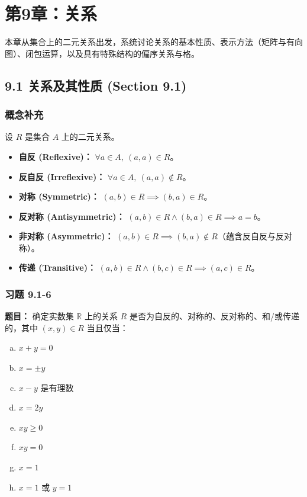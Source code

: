 \documentclass[11pt,UTF8]{article}
\begin{document}
\newpage

\section{第9章：关系}

本章从集合上的二元关系出发，系统讨论关系的基本性质、表示方法（矩阵与有向图）、闭包运算，以及具有特殊结构的偏序关系与格。

\subsection{9.1 关系及其性质 (Section 9.1)}

\subsubsection*{概念补充}
设 $R$ 是集合 $A$ 上的二元关系。
\begin{itemize}
    \item \textbf{自反 (Reflexive)：} $\forall a \in A,\ (a,a) \in R$。
    \item \textbf{反自反 (Irreflexive)：} $\forall a \in A,\ (a,a) \notin R$。
    \item \textbf{对称 (Symmetric)：} $(a,b) \in R \implies (b,a) \in R$。
    \item \textbf{反对称 (Antisymmetric)：} $(a,b) \in R \land (b,a) \in R \implies a = b$。
    \item \textbf{非对称 (Asymmetric)：} $(a,b) \in R \implies (b,a) \notin R$（蕴含反自反与反对称）。
    \item \textbf{传递 (Transitive)：} $(a,b) \in R \land (b,c) \in R \implies (a,c) \in R$。
\end{itemize}

\subsubsection*{习题 9.1-6}
\textbf{题目：} 确定实数集 $\mathbb{R}$ 上的关系 $R$ 是否为自反的、对称的、反对称的、和/或传递的，其中 $(x, y) \in R$ 当且仅当：

\begin{enumerate}[a)]
    \item $x + y = 0$
    \item $x = \pm y$
    \item $x - y$ 是有理数
    \item $x = 2y$
    \item $xy \ge 0$
    \item $xy = 0$
    \item $x = 1$
    \item $x = 1$ 或 $y = 1$
\end{enumerate}
\end{document}
